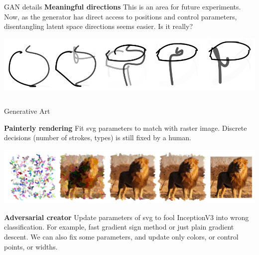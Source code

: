 \documentclass{beamer}
\newcommand{\paragraph}[1]{\noindent\textbf{#1}\quad}
\begin{document}
\begin{frame}[fragile]
\begin{columns}[T]
\begin{column}{.33\textwidth}
\begin{block}{GAN details}
	\paragraph{Meaningful directions} This is an area for future experiments. Now, as the generator has direct access to positions and control parameters, disentangling latent space directions seems easier. Is it really?
	\begin{center}
		\includegraphics[width=0.7\linewidth]{images/inter2.png}
	\end{center}
	
\end{block}

\end{column}

\end{columns}

\begin{block}{Generative Art}
	
	\paragraph{Painterly rendering}
	Fit svg parameters to match with raster image. Discrete decisions (number of strokes, types) is still fixed by a human.
	\begin{center}
		\includegraphics[width=0.6\linewidth]{images/paint_iterations.png}
	\end{center}
	
	\paragraph{Adversarial creator}
	Update parameters of svg to fool InceptionV3 into wrong classification. For example, fast gradient sign method or just plain gradient descent. We can also fix some parameters, and update only colors, or control points, or widths.
	

\end{block}
\end{frame}
\end{document}
